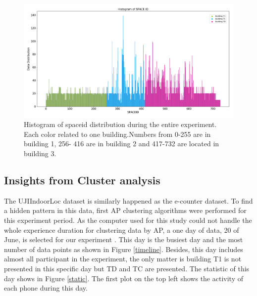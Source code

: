 \begin{figure}
    \centering
    \includegraphics[width = 16 cm]{image/Chapters/Chapter6/uniqspaceid.png}
    \caption{Histogram of spaceid distribution during the entire experiment. Each color related to one building.Numbers from 0-255 are in building 1, 256- 416 are in building 2 and 417-732 are located in building 3.}
    \label{spaceiduniq }
\end{figure}







\subsection{ Insights from Cluster analysis}
The UJIIndoorLoc dataset is similarly happened as the e-counter dataset. To find a hidden pattern in this data, first AP clustering algorithms were performed for this experiment period. As the computer used for this study could not handle the whole experience duration for clustering data by AP, a one day of data, 20 of June, is selected for our experiment . This day is the busiest day and the most number of data points as shown in Figure \ref{timeline}. Besides, this day includes almost all participant in the experiment, the only matter is building T1 is not presented in this specific day but TD and TC are presented. The statistic of this day shows in Figure \ref{static}. The first plot on the top left shows the activity of each phone during this day. 




